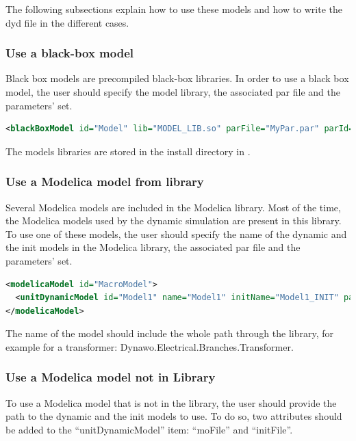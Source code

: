 \documentclass[a4paper, 12pt]{report}
\begin{document}
The following subsections explain how to use these models and how to write the dyd file in the different cases.

\subsubsection{Use a black-box model}

Black box models are precompiled black-box libraries. In order to use a black box model, the user should specify the model library, the associated par file and the parameters' set.
\begin{lstlisting}[language=XML, morekeywords={lib},numbers=none]
<blackBoxModel id="Model" lib="MODEL_LIB.so" parFile="MyPar.par" parId="5">
\end{lstlisting}

The models libraries are stored in the install directory in .

\subsubsection[Use a Modelica model from Dynawo library]{Use a Modelica model from \Dynawo library}

Several Modelica models are included in the \Dynawo Modelica library. Most of the time, the Modelica models used by the dynamic simulation are present in this library. To use one of these models, the user should specify the name of the dynamic and the init models in the Modelica library, the associated par file and the parameters' set.

\begin{lstlisting}[language=XML, morekeywords={name, initName}]
<modelicaModel id="MacroModel">
  <unitDynamicModel id="Model1" name="Model1" initName="Model1_INIT" parFile="MyPar.par" parId="2"/>
</modelicaModel>
\end{lstlisting}

The name of the model should include the whole path through the library, for example for a transformer: Dynawo.Electrical.Branches.Transformer.

\subsubsection[Use a Modelica model not in Dynawo Library]{Use a Modelica model not in \Dynawo Library}

To use a Modelica model that is not in the library, the user should provide the path to the dynamic and the init models to use. To do so, two attributes should be added to the ``unitDynamicModel'' item: ``moFile'' and ``initFile''.
\end{document}
